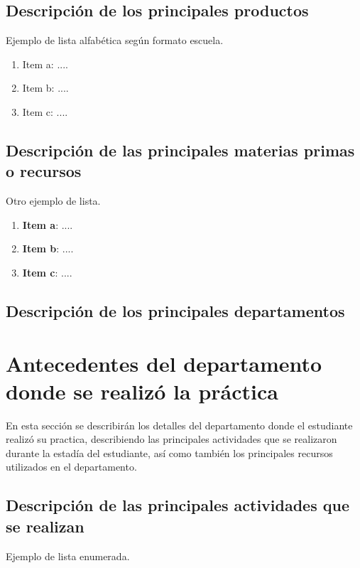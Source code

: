 \documentclass[12pt,letter,spanish]{article}
\begin{document}
\subsection{Descripción de los principales productos}

Ejemplo de lista alfabética según formato escuela.

 \begin{enumerate}[label=\alph*.]
 \item Item a: ....
 \item Item b: ....
 \item Item c: ....
 \end{enumerate}
 

\subsection{Descripción de las principales materias primas o recursos}

Otro ejemplo de lista.

\begin{enumerate}[label=\alph*.]
\item \textbf{Item a}: ....
\item \textbf{Item b}: ....
\item \textbf{Item c}: ....
\end{enumerate}
 

\subsection{Descripción de los principales departamentos}

\newpage

\section{Antecedentes del departamento donde se realizó la práctica} %
En esta sección se describirán los detalles del departamento donde el estudiante realizó su practica, describiendo las principales actividades que se realizaron durante la estadía del estudiante, así como también los principales recursos utilizados en el departamento.

\subsection{Descripción de las principales actividades que se realizan}
Ejemplo de lista enumerada.
\end{document}
